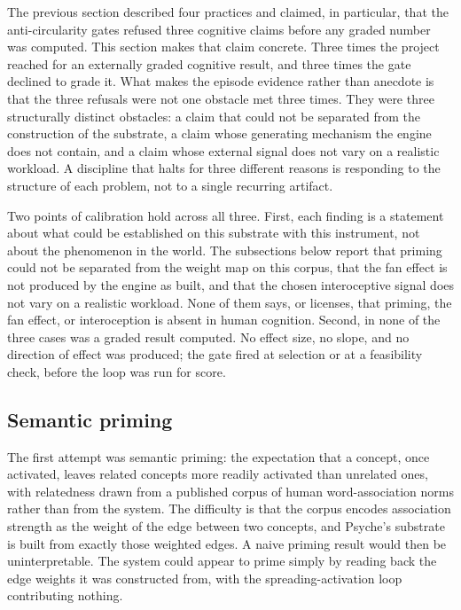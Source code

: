 \documentclass[11pt]{article}
\begin{document}
The previous section described four practices and claimed, in particular, that the
anti-circularity gates refused three cognitive claims before any graded number was
computed. This section makes that claim concrete. Three times the project reached for an
externally graded cognitive result, and three times the gate declined to grade it. What
makes the episode evidence rather than anecdote is that the three refusals were not one
obstacle met three times. They were three structurally distinct obstacles: a claim that
could not be separated from the construction of the substrate, a claim whose generating
mechanism the engine does not contain, and a claim whose external signal does not vary on
a realistic workload. A discipline that halts for three different reasons is responding to
the structure of each problem, not to a single recurring artifact.

Two points of calibration hold across all three. First, each finding is a statement about
what could be established on this substrate with this instrument, not about the phenomenon
in the world. The subsections below report that priming could not be separated from the
weight map on this corpus, that the fan effect is not produced by the engine as built, and
that the chosen interoceptive signal does not vary on a realistic workload. None of them
says, or licenses, that priming, the fan effect, or interoception is absent in human
cognition. Second, in none of the three cases was a graded result computed. No effect
size, no slope, and no direction of effect was produced; the gate fired at selection or at
a feasibility check, before the loop was run for score.

\subsection{Semantic priming}

The first attempt was semantic priming: the expectation that a concept, once activated,
leaves related concepts more readily activated than unrelated ones, with relatedness drawn
from a published corpus of human word-association norms \citep{dedeyne2019swow} rather than
from the system. The difficulty is that the corpus encodes association strength as the
weight of the edge between two concepts, and Psyche's substrate is built from exactly those
weighted edges. A naive priming result would then be uninterpretable. The system could
appear to prime simply by reading back the edge weights it was constructed from, with the
spreading-activation loop contributing nothing.
\end{document}
